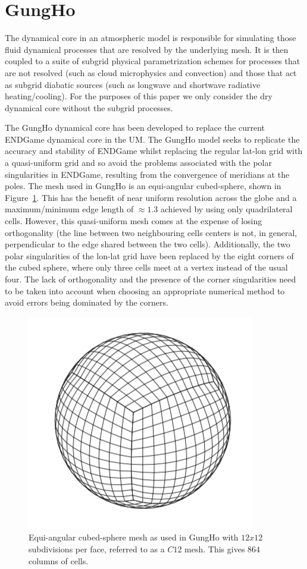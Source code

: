 \documentclass[review,times]{elsarticle}
\begin{document}
\section{\label{sec:GH}GungHo}

The dynamical core in an atmospheric model is responsible for
simulating those fluid dynamical processes that are resolved by the
underlying mesh. It is then coupled to a suite of subgrid physical
parametrization schemes for processes that are not resolved (such as
cloud microphysics and convection) and those that act as subgrid
diabatic sources (such as longwave and shortwave radiative
heating/cooling). For the purposes of this paper we only consider
the dry dynamical core without the subgrid processes.

The GungHo dynamical core has been developed to replace the current ENDGame
dynamical core in the UM. The GungHo model seeks to replicate the
accuracy and stability of ENDGame whilst replacing the regular lat-lon
grid with a quasi-uniform grid and so avoid the problems associated
with the polar singularities in ENDGame, resulting from the
convergence of meridians at the poles. The mesh used in GungHo is an
equi-angular cubed-sphere, shown in Figure~\ref{fig:cubed-sphere}.
This has the benefit of near uniform resolution across the globe and a
maximum/minimum edge length of $\approx 1.3$ achieved by using only
quadrilateral cells.  However, this quasi-uniform mesh comes at the
expense of losing orthogonality (the line between two neighbouring
cells centers is not, in general, perpendicular to the edge shared
between the two cells). Additionally, the two polar singularities of
the lon-lat grid have been replaced by the eight corners of
the cubed sphere, where only three cells meet at a vertex instead of
the usual four. The lack of orthogonality and the presence of the
corner singularities need to be taken into account when choosing an
appropriate numerical method to avoid errors being dominated by the
corners.
%
\begin{figure}
\centering\includegraphics[width=0.6\linewidth]{Cubed-Sphere.png}
\caption{\label{fig:cubed-sphere} Equi-angular cubed-sphere mesh as
used in GungHo with $12x12$ subdivisions per face, 
referred to as a $C12$ mesh. This gives $864$ columns of cells.}
\end{figure}
%
\end{document}
